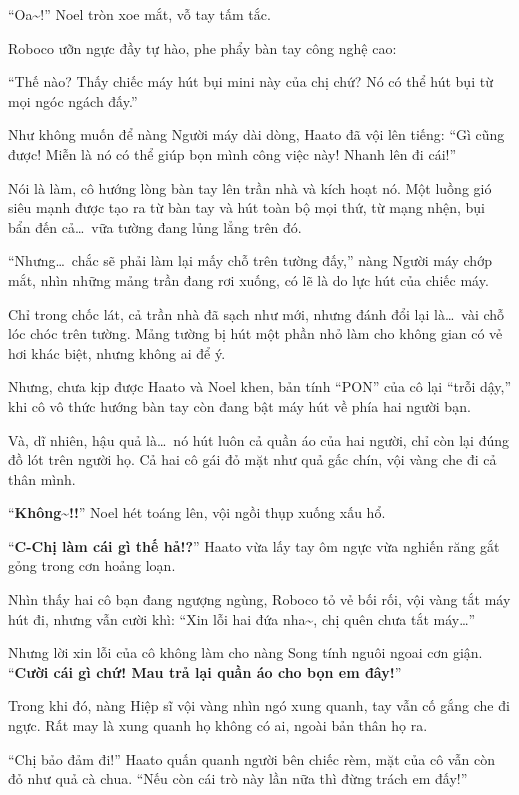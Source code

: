 \documentclass[../main.tex]{subfiles}
\begin{document}
``Oa\~{}!'' Noel tròn xoe mắt, vỗ tay tấm tắc.

Roboco ưỡn ngực đầy tự hào, phe phẩy bàn tay công nghệ cao:

``Thế nào? Thấy chiếc máy hút bụi mini này của chị chứ? Nó có thể hút bụi từ mọi ngóc ngách đấy.''

Như không muốn để nàng Người máy dài dòng, Haato đã vội lên tiếng: ``Gì cũng được! Miễn là nó có thể giúp bọn mình công việc này! Nhanh lên đi cái!''

Nói là làm, cô hướng lòng bàn tay lên trần nhà và kích hoạt nó. Một luồng gió siêu mạnh được tạo ra từ bàn tay và hút toàn bộ mọi thứ, từ mạng nhện, bụi bẩn đến cả\dots\ vữa tường đang lủng lẳng trên đó.

``Nhưng\dots\ chắc sẽ phải làm lại mấy chỗ trên tường đấy,'' nàng Người máy chớp mắt, nhìn những mảng trần đang rơi xuống, có lẽ là do lực hút của chiếc máy.

Chỉ trong chốc lát, cả trần nhà đã sạch như mới, nhưng đánh đổi lại là\dots\ vài chỗ lóc chóc trên tường. Mảng tường bị hút một phần nhỏ làm cho không gian có vẻ hơi khác biệt, nhưng không ai để ý.

Nhưng, chưa kịp được Haato và Noel khen, bản tính ``PON'' của cô lại ``trỗi dậy,'' khi cô vô thức hướng bàn tay còn đang bật máy hút về phía hai người bạn.

Và, dĩ nhiên, hậu quả là\dots\ nó hút luôn cả quần áo của hai người, chỉ còn lại đúng đồ lót trên người họ. Cả hai cô gái đỏ mặt như quả gấc chín, vội vàng che đi cả thân mình.

``\textbf{Không\~{}!!}'' Noel hét toáng lên, vội ngồi thụp xuống xấu hổ.

``\textbf{C-Chị làm cái gì thế hả!?}'' Haato vừa lấy tay ôm ngực vừa nghiến răng gắt gỏng trong cơn hoảng loạn.

Nhìn thấy hai cô bạn đang ngượng ngùng, Roboco tỏ vẻ bối rối, vội vàng tắt máy hút đi, nhưng vẫn cười khì: ``Xin lỗi hai đứa nha\~{}, chị quên chưa tắt máy\dots''

Nhưng lời xin lỗi của cô không làm cho nàng Song tính nguôi ngoai cơn giận. ``\textbf{Cười cái gì chứ! Mau trả lại quần áo cho bọn em đây!}''

Trong khi đó, nàng Hiệp sĩ vội vàng nhìn ngó xung quanh, tay vẫn cố gắng che đi ngực. Rất may là xung quanh họ không có ai, ngoài bản thân họ ra.

``Chị bảo đảm đi!'' Haato quấn quanh người bên chiếc rèm, mặt của cô vẫn còn đỏ như quả cà chua. ``Nếu còn cái trò này lần nữa thì đừng trách em đấy!''
\end{document}
